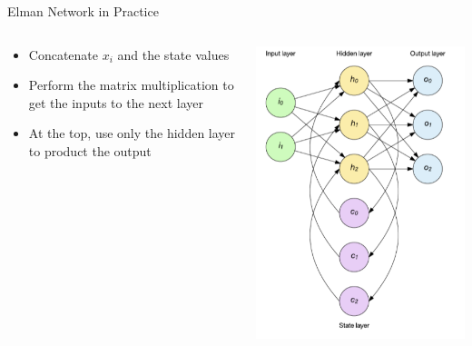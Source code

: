 \documentclass[aspectratio=169]{beamer}
\begin{document}
\begin{frame}[fragile]{Elman Network in Practice}

\begin{columns}
\begin{column}{0.6\textwidth}
\begin{itemize}
	\item Concatenate $x_i$ and the state values
	\item Perform the matrix multiplication to get the inputs to the next layer
	\item At the top, use only the hidden layer to product the output
\end{itemize}
\end{column}
\begin{column}{0.4\textwidth}
\includegraphics[width=1\textwidth]{lectRNN/Elman.png}
\end{column}
\end{columns}
\end{frame}
\end{document}
